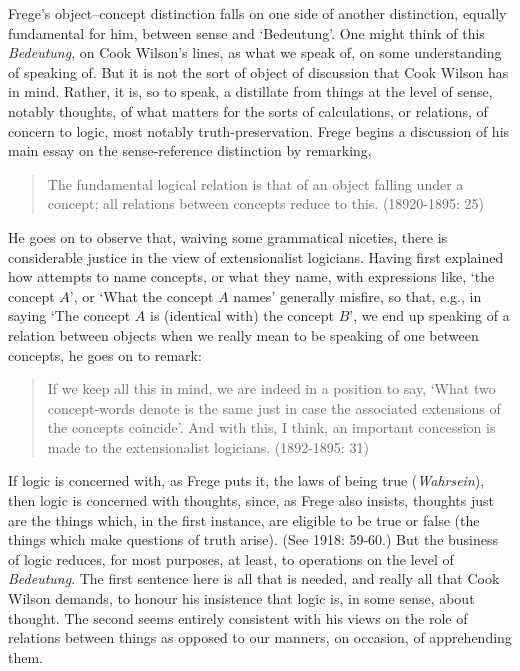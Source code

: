 Frege’s object--concept distinction falls on one side of another distinction, equally fundamental for him, between sense and `Bedeutung'. One might think of this \emph{Bedeutung}, on Cook Wilson’s lines, as what we speak of, on some understanding of speaking of. But it is not the sort of object of discussion that Cook Wilson has in mind. Rather, it is, so to speak, a distillate from things at the level of sense, notably thoughts, of what matters for the sorts of calculations, or relations, of concern to logic, most notably truth-preservation. Frege begins a discussion of his main essay on the sense-reference distinction by remarking,
\begin{quote}
	The fundamental logical relation is that of an object falling under a concept; all relations between concepts reduce to this. (18920-1895: 25)
\end{quote}
He goes on to observe that, waiving some grammatical niceties, there is considerable justice in the view of extensionalist logicians. Having first explained how attempts to name concepts, or what they name, with expressions like, `the concept \( A \)', or `What the concept \( A \) names' generally misfire, so that, e.g., in saying `The concept \( A \) is (identical with) the concept \( B \)', we end up speaking of a relation between objects when we really mean to be speaking of one between concepts, he goes on to remark:
\begin{quote}
	If we keep all this in mind, we are indeed in a position to say, `What two concept-words denote is the same just in case the associated extensions of the concepts coincide'. And with this, I think, an important concession is made to the extensionalist logicians. (1892-1895: 31)
\end{quote}
If logic is concerned with, as Frege puts it, the laws of being true (\emph{Wahrsein}), then logic is concerned with thoughts, since, as Frege also insists, thoughts just are the things which, in the first instance, are eligible to be true or false (the things which make questions of truth arise). (See 1918: 59-60.) But the business of logic reduces, for most purposes, at least, to operations on the level of \emph{Bedeutung}. The first sentence here is all that is needed, and really all that Cook Wilson demands, to honour his insistence that logic is, in some sense, about thought. The second seems entirely consistent with his views on the role of relations between things as opposed to our manners, on occasion, of apprehending them.

